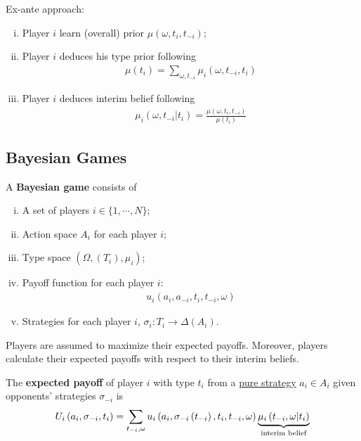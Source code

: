 \documentclass{article}
\begin{document}
   	\begin{remark}
	   	Ex-ante approach:
	   	\begin{enumerate}[(i)]
	   		\item Player $i$ learn (overall) prior $\mu\left(\omega, t_{i}, t_{-i}\right)$;
	   		\item Player $i$ deduces his type prior following
	   		\begin{align}
	   			\mu\left(t_{i}\right)=\sum_{\omega, t_{-i}} \mu_{i}\left(\omega, t_{-i}, t_{i}\right)
	   		\end{align}
	   		\item Player $i$ deduces interim belief following
	   		\begin{align}
	   			\mu_{i}\left(\omega, t_{-i} |t_i \right)
	   			=\frac{\mu\left(\omega, t_{i}, t_{-i}\right)}{\mu\left(t_{i}\right)}
	   		\end{align}
	   	\end{enumerate}
   	\end{remark}
   	
   	\subsection{Bayesian Games}
   	\begin{definition}
   		A \textbf{Bayesian game} consists of
   		\begin{enumerate}[(i)]
   			\item A set of players $i \in \{1, \cdots, N\}$;
   			\item Action space $A_i$ for each player $i$;
   			\item Type space $(\Omega, (T_i), \mu_i)$;
   			\item Payoff function for each player $i$:
   			\begin{align}
   				u_{i}\left(a_{i}, a_{-i}, t_{i}, t_{-i}, \omega\right)
   			\end{align}
   			\item Strategies for each player $i$, $\sigma_i: T_i \to \Delta (A_i)$.
   		\end{enumerate}
   	\end{definition}
   	
   	\begin{assumption}
   		Players are assumed to maximize their expected payoffs. Moreover, players calculate their expected payoffs with respect to their interim beliefs.
   	\end{assumption}
   	
   	\begin{definition}
   		The \textbf{expected payoff} of player $i$ with type $t_i$ from a \ul{pure strategy} $a_i \in A_i$ given opponents' strategies $\sigma_{-i}$ is
   		\begin{align}
   			U_{i}\left(a_{i}, \sigma_{-i}, t_{i}\right)=\sum_{t_{-i}, \omega} u_{i}\left(a_{i}, \sigma_{-i}\left(t_{-i}\right), t_{i}, t_{-i}, \omega\right) \underbrace{\mu_{i}\left(t_{-i}, \omega | t_{i}\right)}_{\text{{interim belief}}}
   		\end{align}
   	\end{definition}
\end{document}
